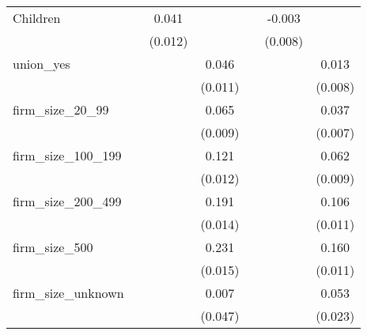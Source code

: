 {\begin{tabular}{l*{6}{c}}
Children            &                     &       0.041\sym{***}&                     &                     &      -0.003         &                     \\
                    &                     &     (0.012)         &                     &                     &     (0.008)         &                     \\
union\_yes           &                     &                     &       0.046\sym{***}&                     &                     &       0.013\sym{*}  \\
                    &                     &                     &     (0.011)         &                     &                     &     (0.008)         \\
firm\_size\_20\_99     &                     &                     &       0.065\sym{***}&                     &                     &       0.037\sym{***}\\
                    &                     &                     &     (0.009)         &                     &                     &     (0.007)         \\
firm\_size\_100\_199   &                     &                     &       0.121\sym{***}&                     &                     &       0.062\sym{***}\\
                    &                     &                     &     (0.012)         &                     &                     &     (0.009)         \\
firm\_size\_200\_499   &                     &                     &       0.191\sym{***}&                     &                     &       0.106\sym{***}\\
                    &                     &                     &     (0.014)         &                     &                     &     (0.011)         \\
firm\_size\_500       &                     &                     &       0.231\sym{***}&                     &                     &       0.160\sym{***}\\
                    &                     &                     &     (0.015)         &                     &                     &     (0.011)         \\
firm\_size\_unknown   &                     &                     &       0.007         &                     &                     &       0.053\sym{**} \\
                    &                     &                     &     (0.047)         &                     &                     &     (0.023)         \\

\end{tabular}}
